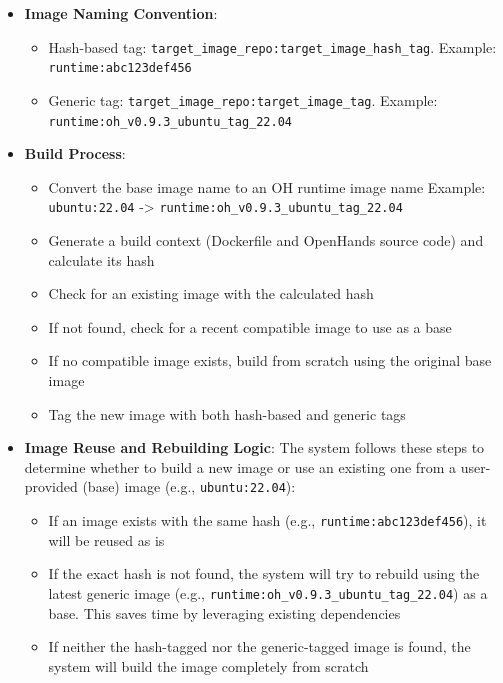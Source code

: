 \begin{itemize}[noitemsep,topsep=0pt,parsep=2pt,partopsep=0pt,leftmargin=18pt]
\item[(1)] \textbf{Image Naming Convention}:
    \begin{itemize}
    \item Hash-based tag: \texttt{{target\_image\_repo}:{target\_image\_hash\_tag}}.
     Example: \texttt{runtime:abc123def456}
     \item Generic tag: \texttt{{target\_image\_repo}:{target\_image\_tag}}.
     Example: \texttt{runtime:oh\_v0.9.3\_ubuntu\_tag\_22.04}
    \end{itemize}

\item[(2)] \textbf{Build Process}:
   \begin{itemize}
   \item[a.] Convert the base image name to an OH runtime image name
      Example: \texttt{ubuntu:22.04} -> \texttt{runtime:oh\_v0.9.3\_ubuntu\_tag\_22.04}
   \item[b.] Generate a build context (Dockerfile and OpenHands source code) and calculate its hash
   \item[c.] Check for an existing image with the calculated hash
   \item[d.] If not found, check for a recent compatible image to use as a base
   \item[e.] If no compatible image exists, build from scratch using the original base image
   \item[f.] Tag the new image with both hash-based and generic tags
   \end{itemize}

\item[(3)] \textbf{Image Reuse and Rebuilding Logic}:
   The system follows these steps to determine whether to build a new image or use an existing one from a user-provided (base) image (e.g., \texttt{ubuntu:22.04}):
   \begin{itemize}
       \item[a.] If an image exists with the same hash (e.g., \texttt{runtime:abc123def456}), it will be reused as is
       \item[b.] If the exact hash is not found, the system will try to rebuild using the latest generic image (e.g., \texttt{runtime:oh\_v0.9.3\_ubuntu\_tag\_22.04}) as a base. This saves time by leveraging existing dependencies
       \item[c.] If neither the hash-tagged nor the generic-tagged image is found, the system will build the image completely from scratch
   \end{itemize}

\end{itemize}


